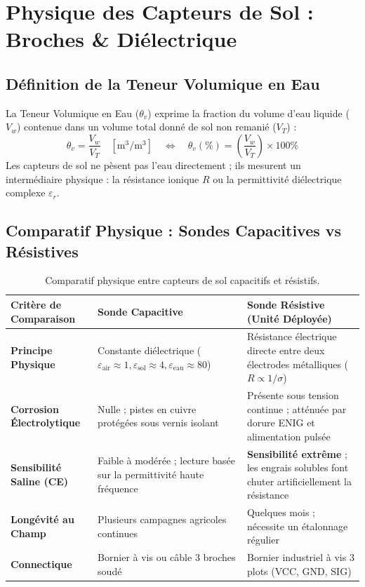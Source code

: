 \documentclass[11pt,a4paper,oneside]{report}
\begin{document}
\chapter{Physique des Capteurs de Sol : Broches \& Diélectrique}

\section{Définition de la Teneur Volumique en Eau}
La Teneur Volumique en Eau ($\theta_v$) exprime la fraction du volume d'eau liquide ($V_w$) contenue dans un volume total donné de sol non remanié ($V_T$) :
\begin{equation}
\theta_v = \frac{V_w}{V_T} \quad [\text{m}^3/\text{m}^3] \quad \Longleftrightarrow \quad \theta_v(\%) = \left(\frac{V_w}{V_T}\right) \times 100\%
\end{equation}
Les capteurs de sol ne pèsent pas l'eau directement ; ils mesurent un intermédiaire physique : la résistance ionique $R$ ou la permittivité diélectrique complexe $\varepsilon_r$.

\section{Comparatif Physique : Sondes Capacitives vs Résistives}
\begin{table}[h!]
\centering
\small
\begin{tabularx}{\linewidth}{lXX}
\toprule
\textbf{Critère de Comparaison} & \textbf{Sonde Capacitive} & \textbf{Sonde Résistive (Unité Déployée)} \\
\midrule
\textbf{Principe Physique} & Constante diélectrique ($\varepsilon_{\text{air}} \approx 1, \varepsilon_{\text{sol}} \approx 4, \varepsilon_{\text{eau}} \approx 80$) & Résistance électrique directe entre deux électrodes métalliques ($R \propto 1 / \sigma$) \\
\textbf{Corrosion Électrolytique} & Nulle ; pistes en cuivre protégées sous vernis isolant & Présente sous tension continue ; atténuée par dorure ENIG et alimentation pulsée \\
\textbf{Sensibilité Saline (CE)} & Faible à modérée ; lecture basée sur la permittivité haute fréquence & \textbf{Sensibilité extrême} ; les engrais solubles font chuter artificiellement la résistance \\
\textbf{Longévité au Champ} & Plusieurs campagnes agricoles continues & Quelques mois ; nécessite un étalonnage régulier \\
\textbf{Connectique} & Bornier à vis ou câble 3 broches soudé & Bornier industriel à vis 3 plots (VCC, GND, SIG) \\
\bottomrule
\end{tabularx}
\caption{Comparatif physique entre capteurs de sol capacitifs et résistifs.}
\end{table}
\end{document}
